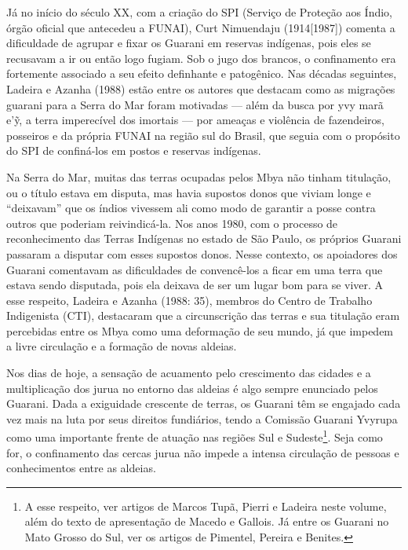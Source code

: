 \documentclass{article}
\begin{document}
J\'a no in\'icio do s\'eculo XX, com a cria\c{c}\~ao do SPI (Servi\c{c}o
de Prote\c{c}\~ao aos \'Indio, \'org\~ao oficial que antecedeu a
FUNAI), Curt Nimuendaju (1914[1987]) comenta a dificuldade de agrupar e
fixar os Guarani em reservas ind\'igenas, pois eles se recusavam a ir
ou ent\~ao logo fugiam. Sob o jugo dos brancos, o confinamento era
fortemente associado a seu efeito definhante e patog\^enico. Nas
d\'ecadas seguintes, Ladeira e Azanha (1988) est\~ao entre os autores
que destacam como as migra\c{c}\~oes guarani para a Serra do Mar foram
motivadas --- al\'em da busca por yvy mar\~a e{\textquoteright}\~{y}, a
terra imperec\'ivel dos imortais --- por amea\c{c}as e viol\^encia de
fazendeiros, posseiros e da pr\'opria FUNAI na regi\~ao sul do Brasil,
que seguia com o prop\'osito do SPI de confin\'a-los em postos e
reservas ind\'igenas.

Na Serra do Mar, muitas das terras ocupadas pelos Mbya n\~ao tinham
titula\c{c}\~ao, ou o t\'itulo estava em disputa, mas havia supostos
donos que viviam longe e
{\textquotedblleft}deixavam{\textquotedblright} que os \'indios
vivessem ali como modo de garantir a posse contra outros que poderiam
reivindic\'a-la. Nos anos 1980, com o processo de reconhecimento das
Terras Ind\'igenas no estado de S\~ao Paulo, os pr\'oprios Guarani
passaram a disputar com esses supostos donos. Nesse contexto, os
apoiadores dos Guarani comentavam as dificuldades de convenc\^e-los a
ficar em uma terra que estava sendo disputada, pois ela deixava de ser
um lugar bom para se viver. A esse respeito, Ladeira e Azanha (1988:
35), membros do Centro de Trabalho Indigenista (CTI), destacaram que a
circunscri\c{c}\~ao das terras e sua titula\c{c}\~ao eram percebidas
entre os Mbya como uma deforma\c{c}\~ao de seu mundo, j\'a que impedem
a livre circula\c{c}\~ao e a forma\c{c}\~ao de novas aldeias. 

Nos dias de hoje, a sensa\c{c}\~ao de acuamento pelo crescimento das
cidades e a multiplica\c{c}\~ao dos jurua no entorno das aldeias \'e
algo sempre enunciado pelos Guarani. Dada a exiguidade crescente de
terras, os Guarani t\^em se engajado cada vez mais na luta por seus
direitos fundi\'arios, tendo a Comiss\~ao Guarani Yvyrupa como uma
importante frente de atua\c{c}\~ao nas regi\~oes Sul e
Sudeste\footnote{ A esse respeito, ver artigos de Marcos Tup\~a, Pierri
e Ladeira neste volume, al\'em do texto de apresenta\c{c}\~ao de Macedo
e Gallois. J\'a entre os Guarani no Mato Grosso do Sul, ver os artigos
de Pimentel, Pereira e Benites.}. Seja como for, o confinamento das
cercas jurua n\~ao impede a intensa circula\c{c}\~ao de pessoas e
conhecimentos entre as aldeias. 
\end{document}
